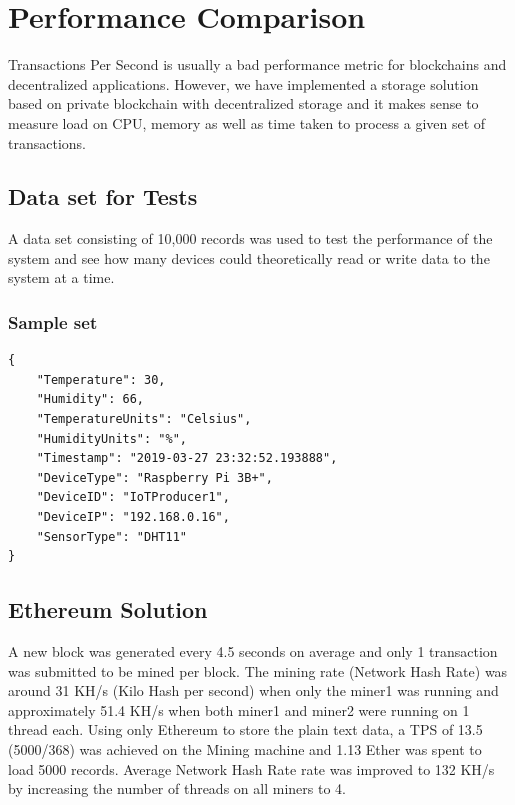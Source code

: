\documentclass[11pt,openright]{report}
\begin{document}
\section{Performance Comparison}
Transactions Per Second is usually a bad performance metric for blockchains and decentralized applications. However, we have implemented a storage solution based on private blockchain with decentralized storage and it makes sense to measure load on CPU, memory as well as time taken to process a given set of transactions.

\subsection{Data set for Tests}
A data set consisting of 10,000 records was used to test the performance of the system and see how many devices could theoretically read or write data to the system at a time.

\subsubsection{Sample set}
\begin{lstlisting}
{
    "Temperature": 30,
    "Humidity": 66,
    "TemperatureUnits": "Celsius",
    "HumidityUnits": "%",
    "Timestamp": "2019-03-27 23:32:52.193888",
    "DeviceType": "Raspberry Pi 3B+",
    "DeviceID": "IoTProducer1",
    "DeviceIP": "192.168.0.16",
    "SensorType": "DHT11"
}
\end{lstlisting}

\subsection{Ethereum Solution}
A new block was generated every 4.5 seconds on average and only 1 transaction was submitted to be mined per block. The mining rate (Network Hash Rate) was around 31 KH/s (Kilo Hash per second) when only the miner1 was running and approximately 51.4 KH/s when both miner1 and miner2 were running on 1 thread each. Using only Ethereum to store the plain text data, a TPS of 13.5 (5000/368) was achieved on the Mining machine and 1.13 Ether was spent to load 5000 records. Average Network Hash Rate rate was improved to 132 KH/s by increasing the number of threads on all miners to 4.
\end{document}
